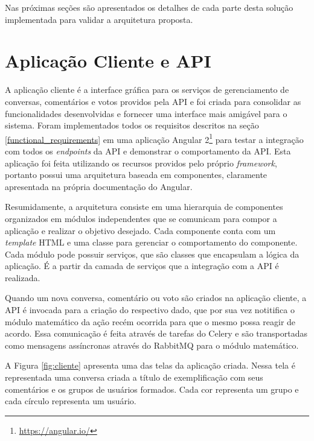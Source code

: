   Nas próximas seções são apresentados os detalhes de cada parte desta solução implementada
  para validar a arquitetura proposta.
  
  
  \section{Aplicação Cliente e API}
    
    A aplicação cliente é a interface gráfica para os serviços de 
    gerenciamento de conversas, comentários e votos providos pela API e foi
    criada para consolidar as funcionalidades desenvolvidas e fornecer uma interface mais
    amigável para o sistema. Foram implementados todos os requisitos descritos na seção \ref{functional_requirements}
    em uma aplicação Angular 2\footnote{\href{https://angular.io/}{https://angular.io/}} para
    testar a integração com todos os \textit{endpoints} da API e demonstrar o comportamento da API. Esta aplicação foi feita utilizando os recursos providos pelo próprio \textit{framework}, portanto
    possui uma arquitetura baseada em componentes, claramente apresentada na própria documentação do Angular.
    
    
    Resumidamente, a arquitetura consiste em uma hierarquia de componentes organizados
    em módulos independentes que se comunicam para compor a aplicação e realizar o objetivo desejado.
    Cada componente conta com um \textit{template} HTML e uma classe para gerenciar o comportamento do componente.
    Cada módulo pode possuir serviços, que são classes que encapsulam a lógica da aplicação.
    É a partir da camada de serviços que a integração com a API é realizada.
    
    Quando um nova conversa, comentário ou voto são criados na aplicação cliente,
    a API é invocada para a criação do respectivo dado, que por sua vez
    notitifica o módulo matemático da ação recém ocorrida para que o mesmo possa reagir de acordo.
    Essa comunicação é feita através de tarefas do Celery e são transportadas como mensagens assíncronas
    através do RabbitMQ para o módulo matemático.
    
    A Figura \ref{fig:cliente} apresenta uma das telas da aplicação criada. 
    Nessa tela é representada uma conversa criada a título de exemplificação
    com seus comentários e os grupos de usuários formados. Cada cor representa um grupo e cada círculo representa um usuário. 
    
